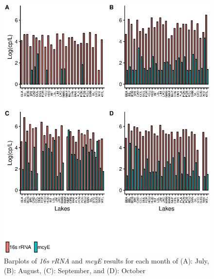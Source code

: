 \begin{figure}[!h]
	\includegraphics[width=\textwidth]{figures/gene}
	\caption{
Barplots of \emph{16s rRNA} and \emph{mcyE} results for each month of
(A): July, 
(B): August,
(C): September, and
(D): October 
}
	\label{fig:gene}
\end{figure}

